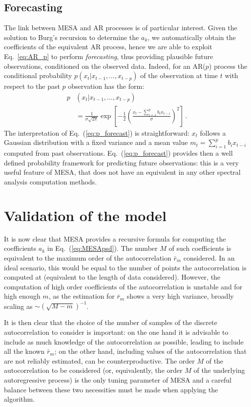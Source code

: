 \documentclass{aa}
\begin{document}
\subsection{Forecasting} \label{sec:forecasting}
The link between MESA and AR processes is of particular interest. Given the solution to Burg's recursion to determine the $a_k$, we automatically obtain the coefficients of the equivalent AR process, hence we are able to exploit Eq.~\ref{eq:AR_p} to perform \emph{forecasting}, thus providing plausible future observations, conditioned on the observed data.
Indeed, for an AR($p$) process the conditional probability $p(x_t|x_{t-1}, \ldots , x_{t-p})$ of the observation at time $t$ with respect to the past $p$ observation has the form:
\begin{align}\label{eq:p_forecast}
	p&(x_t|x_{t-1}, \ldots , x_{t-p}) \nonumber\\
	&= \frac{1}{\sigma\sqrt{2\pi}} \exp\left[-\frac{1}{2} \left(\frac{x_t - \sum_{i = 1}^p b_i x_{t-i}}{\sigma}\right)^2\right]\,.
\end{align}
The interpretation of Eq.~(\ref{eq:p_forecast}) is straightforward: $x_t$ follows a Gaussian distribution with a fixed variance and a mean value $m_t = \sum_{i = 1}^p b_i x_{t-i}$ computed from past observations.
Eq.~(\ref{eq:p_forecast}) provides then a well defined probability framework for predicting future observations: this is a very useful feature of MESA, that does not have an equivalent in any other spectral analysis computation methods.

\section{Validation of the model}\label{sec:validation}
It is now clear that MESA provides a recursive formula for computing the coefficients $a_k$ in Eq.~(\ref{eq:MESApsd}). The number $M$ of such coefficients is
equivalent to the maximum order of the autocorrelation $\bar{r}_m$ considered. In an ideal scenario, this would be equal to the number of points the autocorrelation is computed at (equivalent to the length of data considered). However, the computation of high order coefficients of the autocorrelation is unstable and for high enough $m$, as the estimation for  $\bar{r}_m$ shows a very high variance, broadly scaling as $\sim \left(\sqrt{M - m}\right)^{-1}$.

It is then clear that the choice of the number of samples of the discrete autocorrelation to consider is important: 
on the one hand it is advisable to include as much knowledge of the autocorrelation as possible, leading to include all the known $\bar{r}_m$; on the other hand, including values of the autocorrelation that are not reliably estimated, can be counterproductive.
The order $M$ of the autocorrelation to be considered (or, equivalently, the order $M$ of the underlying autoregressive process) is the only tuning parameter of MESA and a careful balance between these two necessities must be made when applying the algorithm.
\end{document}
